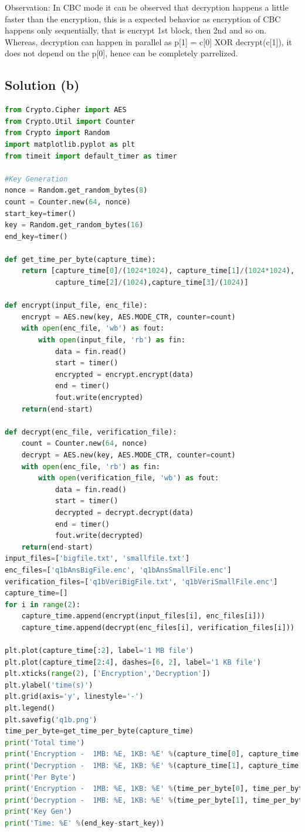 \documentclass[12pt]{article}%
\begin{document}
Observation:
In CBC mode it can be observed that decryption happens a little faster than the encryption, this is a expected behavior as encryption of CBC happens only sequentially, that is encrypt 1st block, then 2nd and so on. Whereas, decryption can happen in parallel as p[1] = c[0] XOR decrypt(c[1]), it does not depend on the p[0], hence can be completely parrelized.

\subsection{Solution (b)}
\begin{lstlisting}[language=Python]
from Crypto.Cipher import AES
from Crypto.Util import Counter
from Crypto import Random
import matplotlib.pyplot as plt
from timeit import default_timer as timer

#Key Generation
nonce = Random.get_random_bytes(8)
count = Counter.new(64, nonce)
start_key=timer()
key = Random.get_random_bytes(16)
end_key=timer()

def get_time_per_byte(capture_time):
    return [capture_time[0]/(1024*1024), capture_time[1]/(1024*1024),
            capture_time[2]/(1024),capture_time[3]/(1024)]

def encrypt(input_file, enc_file):
    encrypt = AES.new(key, AES.MODE_CTR, counter=count)
    with open(enc_file, 'wb') as fout:
        with open(input_file, 'rb') as fin:
            data = fin.read()
            start = timer()
            encrypted = encrypt.encrypt(data)
            end = timer()
            fout.write(encrypted)
    return(end-start)
    
def decrypt(enc_file, verification_file):
    count = Counter.new(64, nonce)
    decrypt = AES.new(key, AES.MODE_CTR, counter=count)
    with open(enc_file, 'rb') as fin:
        with open(verification_file, 'wb') as fout:
            data = fin.read()
            start = timer()
            decrypted = decrypt.decrypt(data)
            end = timer()
            fout.write(decrypted)
    return(end-start)
input_files=['bigfile.txt', 'smallfile.txt']
enc_files=['q1bAnsBigFile.enc', 'q1bAnsSmallFile.enc']
verification_files=['q1bVeriBigFile.txt', 'q1bVeriSmallFile.enc']
capture_time=[]
for i in range(2):
    capture_time.append(encrypt(input_files[i], enc_files[i]))
    capture_time.append(decrypt(enc_files[i], verification_files[i]))

plt.plot(capture_time[:2], label='1 MB file')
plt.plot(capture_time[2:4], dashes=[6, 2], label='1 KB file')
plt.xticks(range(2), ['Encryption','Decryption'])
plt.ylabel('time(s)')
plt.grid(axis='y', linestyle='-')
plt.legend()
plt.savefig('q1b.png')
time_per_byte=get_time_per_byte(capture_time)
print('Total time')
print('Encryption -  1MB: %E, 1KB: %E' %(capture_time[0], capture_time[2]))
print('Decryption -  1MB: %E, 1KB: %E' %(capture_time[1], capture_time[3]))
print('Per Byte')
print('Encryption -  1MB: %E, 1KB: %E' %(time_per_byte[0], time_per_byte[2]))
print('Decryption -  1MB: %E, 1KB: %E' %(time_per_byte[1], time_per_byte[3]))
print('Key Gen')
print('Time: %E' %(end_key-start_key))
\end{lstlisting}
\end{document}
